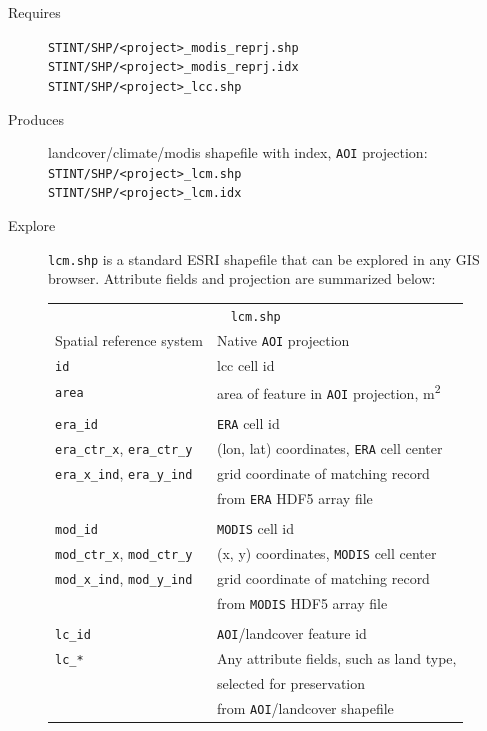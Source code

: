 \documentclass[twoside,a4paper]{refart}
\begin{document}
  \begin{description}
    \item [Requires]
      \texttt{STINT/SHP/<project>\_modis\_reprj.shp} \\
      \texttt{STINT/SHP/<project>\_modis\_reprj.idx} \\
      \texttt{STINT/SHP/<project>\_lcc.shp}
  
  
    \item [Produces]
      landcover/climate/modis shapefile with index, 
      \texttt{AOI} projection:\\
      \texttt{STINT/SHP/<project>\_lcm.shp}\\
      \texttt{STINT/SHP/<project>\_lcm.idx}
      

    \item [Explore]
      \texttt{lcm.shp} is a standard ESRI shapefile that can be explored in any GIS browser.  Attribute fields and projection are summarized below:
      
\begin{tabular}{ll}
       \multicolumn{2}{c}{\texttt{lcm.shp}} \\
Spatial reference system        & Native \texttt{AOI} projection \\
\texttt{id}                     & lcc cell id \\
\texttt{area}                   & area of feature in \texttt{AOI} projection, m\textsuperscript{2}\\  
\\
\texttt{era\_id}                & \texttt{ERA} cell id \\  
\texttt{era\_ctr\_x}, \texttt{era\_ctr\_y} & (lon, lat) coordinates, \texttt{ERA} cell center \\
\texttt{era\_x\_ind}, \texttt{era\_y\_ind} & grid coordinate of matching record \\
                                          & from \texttt{ERA} HDF5 array file\\
\\
\texttt{mod\_id}                & \texttt{MODIS} cell id \\  
\texttt{mod\_ctr\_x}, \texttt{mod\_ctr\_y} & (x, y) coordinates, \texttt{MODIS} cell center \\
\texttt{mod\_x\_ind}, \texttt{mod\_y\_ind} & grid coordinate of matching record \\
                                          & from \texttt{MODIS} HDF5 array file\\
\\
\texttt{lc\_id}                & \texttt{AOI}/landcover feature id \\
\texttt{lc\_*}                & Any attribute fields, such as land type, \\
                             & selected for preservation \\
                             & from \texttt{AOI}/landcover shapefile \\
\end{tabular}


\end{description}
\end{document}
